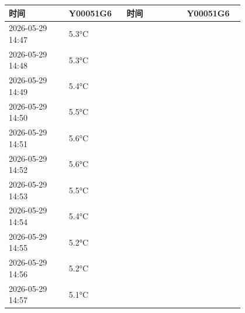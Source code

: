 \documentclass[UTF8,10pt,a4paper,fontset=fandol]{ctexart}
\newcommand{\fieldvalue}[1]{#1}
\begin{document}
\begin{center}
\small
\begin{tabular}{|p{0.22\linewidth}|p{0.18\linewidth}|p{0.22\linewidth}|p{0.18\linewidth}|}
\hline
时间 & Y00051G6 & 时间 & Y00051G6 \\
\hline
\fieldvalue{2026-05-29 14:47} &
\fieldvalue{5.3°C} & & \\
\hline
\fieldvalue{2026-05-29 14:48} &
\fieldvalue{5.3°C} & & \\
\hline
\fieldvalue{2026-05-29 14:49} &
\fieldvalue{5.4°C} & & \\
\hline
\fieldvalue{2026-05-29 14:50} &
\fieldvalue{5.5°C} & & \\
\hline
\fieldvalue{2026-05-29 14:51} &
\fieldvalue{5.6°C} & & \\
\hline
\fieldvalue{2026-05-29 14:52} &
\fieldvalue{5.6°C} & & \\
\hline
\fieldvalue{2026-05-29 14:53} &
\fieldvalue{5.5°C} & & \\
\hline
\fieldvalue{2026-05-29 14:54} &
\fieldvalue{5.4°C} & & \\
\hline
\fieldvalue{2026-05-29 14:55} &
\fieldvalue{5.2°C} & & \\
\hline
\fieldvalue{2026-05-29 14:56} &
\fieldvalue{5.2°C} & & \\
\hline
\fieldvalue{2026-05-29 14:57} &
\fieldvalue{5.1°C} & & \\
\hline

\end{tabular}
\end{center}
\end{document}
